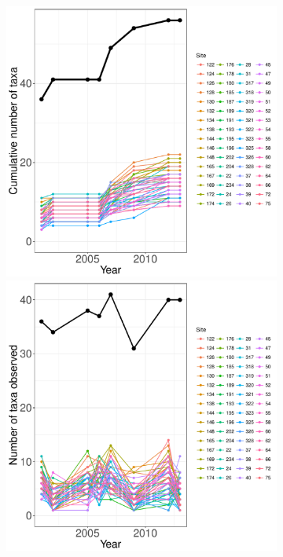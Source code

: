\documentclass[11pt, oneside]{article}
\begin{document}
\begin{figure}[h!]
\begin{figure}[h!]
\centering
\includegraphics[scale = 0.4]{hbr-birds-sillett_species_accumulation_curve.pdf}
\includegraphics[scale = 0.4]{hbr-birds-sillett_num_taxa_over_time.pdf}

\end{figure}
\end{figure}
\end{document}
